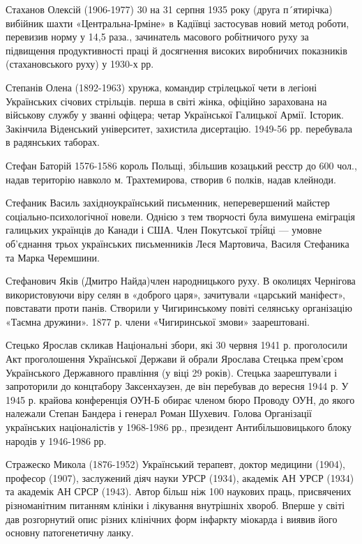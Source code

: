 Стаханов Олексій (1906-1977) 30 на 31 серпня 1935 року (друга п´ятирічка) вибійник шахти «Центральна-Ірміне» в Кадіївці застосував новий метод роботи, перевизив норму у 14,5 раза., зачинатель масового робітничого руху за підвищення продуктивності праці й досягнення високих виробничих показників (стахановського руху) у 1930-х рр.

Степанів Олена (1892-1963) хрунжа,  командир стрілецької чети в легіоні Українських січових стрільців. перша в світі жінка, офіційно зарахована на військову службу у званні офіцера; четар Української Галицької Армії. Історик. Закінчила Віденський університет, захистила дисертацію. 1949-56 рр. перебувала в радянських таборах.

Стефан Баторій 1576-1586 король Польщі, збільшив козацький реєстр до 600 чол., надав територію навколо м. Трахтемирова, створив 6 полків, надав клейноди.

Стефаник Василь західноукраїнський письменник, неперевершений майстер соціально-психологічної новели. Однією з тем творчості була вимушена еміграція галицьких українців до Канади і США. Член Покутської трі́йці --- умовне об'єднання трьох українських письменників Леся Мартовича, Василя Стефаника та Марка Черемшини.  

Стефанович Яків (Дмитро Найда)член народницького руху. В околицях Чернігова використовуючи віру селян в «доброго царя»,  зачитували «царський маніфест», повставати проти панів. Створили у Чигиринському повіті селянську організацію «Таємна дружини». 1877 р. члени «Чигиринської змови» заарештовані.  

Стецько Ярослав скликав Національні збори, які 30 червня 1941 р. проголосили Акт проголошення Української Держави й обрали Ярослава Стецька прем'єром Українського Державного правління (у віці 29 років). Стецька заарештували і запроторили до концтабору Заксенхаузен, де він перебував до вересня 1944 р. У 1945 р. крайова конференція ОУН-Б обирає членом бюро Проводу ОУН, до якого належали Степан Бандера і генерал Роман Шухевич. Голова Організації українських націоналістів у 1968-1986 рр., президент Антибільшовицького блоку народів у 1946-1986 рр.

Стражеско Микола (1876-1952) Український терапевт, доктор медицини (1904), професор (1907), заслужений діяч науки УРСР (1934), академік АН УРСР (1934) та академік АН СРСР (1943). Автор більш ніж 100 наукових праць, присвячених різноманітним питанням клініки і лікування внутрішніх хвороб. Вперше у світі дав розгорнутий опис різних клінічних форм інфаркту міокарда і виявив його основну патогенетичну ланку.

